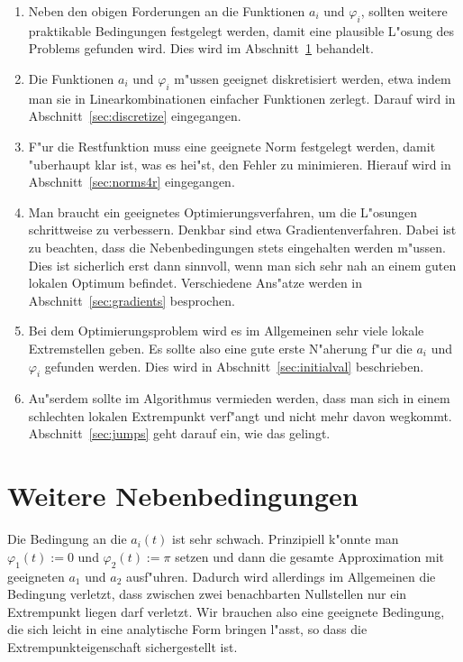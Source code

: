 \documentclass[a4paper]{scrartcl}
\newcommand{\pphi}{{\varphi}}
\begin{document}
\begin{enumerate}
  \item Neben den obigen Forderungen an die Funktionen $a_i$ und $\pphi_i$, sollten weitere praktikable Bedingungen festgelegt werden, damit eine plausible L"osung des Problems gefunden wird. 
  Dies wird im Abschnitt~\ref{sec:moreconds} behandelt. 
  \item Die Funktionen $a_i$ und $\pphi_i$ m"ussen geeignet diskretisiert werden, etwa indem man sie in Linearkombinationen einfacher Funktionen zerlegt. 
  Darauf wird in Abschnitt~\ref{sec:discretize} eingegangen.
  \item F"ur die Restfunktion muss eine geeignete Norm festgelegt werden, damit "uberhaupt klar ist, was es hei"st, den Fehler zu minimieren. 
  Hierauf wird in Abschnitt~\ref{sec:norms4r} eingegangen.
  \item Man braucht ein geeignetes Optimierungsverfahren, um die L"osungen schrittweise zu verbessern. 
  Denkbar sind etwa Gradientenverfahren. Dabei ist zu beachten, dass die Nebenbedingungen stets eingehalten werden m"ussen. 
  Dies ist sicherlich erst dann sinnvoll, wenn man sich sehr nah an einem guten lokalen Optimum befindet. 
  Verschiedene Ans"atze werden in Abschnitt~\ref{sec:gradients} besprochen.
  \item Bei dem Optimierungsproblem wird es im Allgemeinen sehr viele lokale Extremstellen geben. 
  Es sollte also eine gute erste N"aherung f"ur die $a_i$ und $\pphi_i$ gefunden werden. 
  Dies wird in Abschnitt~\ref{sec:initialval} beschrieben. 
  \item Au"serdem sollte im Algorithmus vermieden werden, dass man sich in einem schlechten lokalen Extrempunkt verf"angt und nicht mehr davon wegkommt. 
  Abschnitt~\ref{sec:jumps} geht darauf ein, wie das gelingt.
\end{enumerate}


\section{Weitere Nebenbedingungen} \label{sec:moreconds}

Die Bedingung an die $a_i(t)$ ist sehr schwach. 
Prinzipiell k"onnte man $\pphi_1(t):=0$ und $\pphi_2(t):=\pi$ setzen und dann die gesamte Approximation mit geeigneten $a_1$ und $a_2$ ausf"uhren. 
Dadurch wird allerdings im Allgemeinen die Bedingung verletzt, dass zwischen zwei benachbarten Nullstellen nur ein Extrempunkt liegen darf verletzt. 
Wir brauchen also eine geeignete Bedingung, die sich leicht in eine analytische Form bringen l"asst, so dass die Extrempunkteigenschaft sichergestellt ist. 
\end{document}
